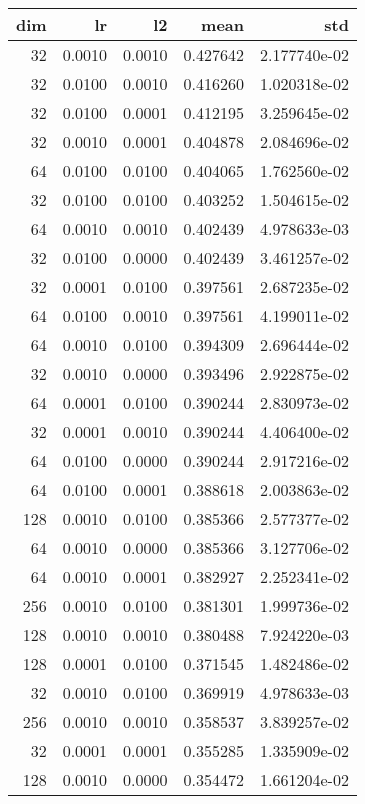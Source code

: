 \begin{tabular}{rrrrr}
\toprule
 dim &      lr &      l2 &      mean &           std \\
\midrule
  32 &  0.0010 &  0.0010 &  0.427642 &  2.177740e-02 \\
  32 &  0.0100 &  0.0010 &  0.416260 &  1.020318e-02 \\
  32 &  0.0100 &  0.0001 &  0.412195 &  3.259645e-02 \\
  32 &  0.0010 &  0.0001 &  0.404878 &  2.084696e-02 \\
  64 &  0.0100 &  0.0100 &  0.404065 &  1.762560e-02 \\
  32 &  0.0100 &  0.0100 &  0.403252 &  1.504615e-02 \\
  64 &  0.0010 &  0.0010 &  0.402439 &  4.978633e-03 \\
  32 &  0.0100 &  0.0000 &  0.402439 &  3.461257e-02 \\
  32 &  0.0001 &  0.0100 &  0.397561 &  2.687235e-02 \\
  64 &  0.0100 &  0.0010 &  0.397561 &  4.199011e-02 \\
  64 &  0.0010 &  0.0100 &  0.394309 &  2.696444e-02 \\
  32 &  0.0010 &  0.0000 &  0.393496 &  2.922875e-02 \\
  64 &  0.0001 &  0.0100 &  0.390244 &  2.830973e-02 \\
  32 &  0.0001 &  0.0010 &  0.390244 &  4.406400e-02 \\
  64 &  0.0100 &  0.0000 &  0.390244 &  2.917216e-02 \\
  64 &  0.0100 &  0.0001 &  0.388618 &  2.003863e-02 \\
 128 &  0.0010 &  0.0100 &  0.385366 &  2.577377e-02 \\
  64 &  0.0010 &  0.0000 &  0.385366 &  3.127706e-02 \\
  64 &  0.0010 &  0.0001 &  0.382927 &  2.252341e-02 \\
 256 &  0.0010 &  0.0100 &  0.381301 &  1.999736e-02 \\
 128 &  0.0010 &  0.0010 &  0.380488 &  7.924220e-03 \\
 128 &  0.0001 &  0.0100 &  0.371545 &  1.482486e-02 \\
  32 &  0.0010 &  0.0100 &  0.369919 &  4.978633e-03 \\
 256 &  0.0010 &  0.0010 &  0.358537 &  3.839257e-02 \\
  32 &  0.0001 &  0.0001 &  0.355285 &  1.335909e-02 \\
 128 &  0.0010 &  0.0000 &  0.354472 &  1.661204e-02 \\

\end{tabular}
